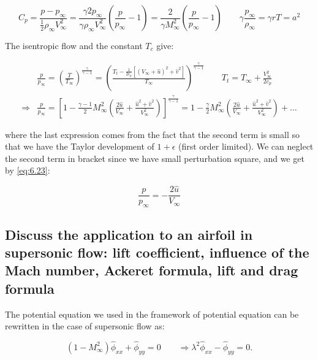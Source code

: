 \documentclass[british,french,11pt, a4paper, openany]{article}
\begin{document}
\begin{equation}
C_p = \frac{p-p_\infty}{\frac{1}{2}\rho _\infty V_\infty^2} = \frac{\gamma 2p_\infty}{\gamma \rho _\infty V_\infty ^2}\left(\frac{p}{p_\infty}-1 \right) =  \frac{2}{\gamma M^2_\infty} \left(\frac{p}{p_\infty} -1 \right) \qquad \gamma \frac{p_\infty}{\rho _\infty} = \gamma rT = a^2
\label{eq:6.23}
\end{equation}

The isentropic flow and the constant $T_c$ give: 

\begin{equation}
\begin{aligned}
&\frac{p}{p_\infty}  =\left( \frac{T}{T_\infty} \right) ^{\frac{\gamma}{\gamma - 1}} = \left( \frac{T_t - \frac{1}{2c_p}\left[ (V_\infty +\hat{u})^2 +\hat{v}^2 \right]}{T_\infty} \right)^{\frac{\gamma}{\gamma-1}} \qquad T_t = T_\infty + \frac{V_\infty^2}{2c_p}\\
\Rightarrow &\frac{p}{p_\infty}  =\left[ 1- \frac{\gamma -1}{2}M^2_\infty \left( \frac{2\hat{u}}{V_\infty} +\frac{\hat{u}^2 +\hat{v}^2}{V^2_\infty} \right) \right]^{\frac{\gamma}{\gamma-1}} = 1- \frac{\gamma}{2}M^2_\infty \left( \frac{2\hat{u}}{V_\infty} +\frac{\hat{u}^2 +\hat{v}^2}{V^2_\infty} \right)+\dots
\end{aligned}
\end{equation}

where the last expression comes from the fact that the second term is small so that we have the Taylor development of $1+\epsilon$ (first order limited). We can neglect the second term in bracket since we have small perturbation square, and we get by \eqref{eq:6.23}:

\begin{equation}
\frac{p}{p_\infty} = -\frac{2\hat{u}}{V_\infty}
\end{equation}

\subsection{Discuss the application to an airfoil in supersonic flow: lift coefficient, influence
	of the Mach number, Ackeret formula, lift and drag formula}

The potential equation we used in the framework of potential equation can be rewritten in the case of supersonic flow as:

\begin{equation}
(1-M_\infty^2) \hat{\phi}_{xx} + \hat{\phi}_{yy} = 0 \qquad \Rightarrow \lambda ^2 \hat{\phi} _{xx} - \hat{\phi} _{yy} = 0.
\end{equation}
\end{document}

